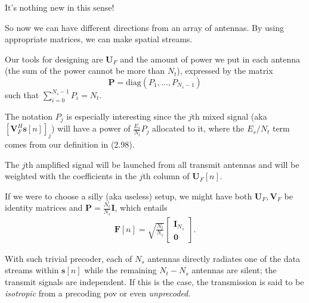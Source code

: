 \documentclass[a4paper, 12pt]{book}
\begin{document}
\noindent\colorbox{teal!10}{
    \begin{minipage}{\dimexpr\linewidth-2\fboxsep}
        It's nothing new in this sense!
    \end{minipage}
}

So now we can have different directions from an array of antennas.
By using appropriate matrices, we can make spatial streams.

Our tools for designing are $\mathbf{U}_F$ and the amount of power we put in each antenna (the sum of the power cannot be more than $N_t$), expressed by the matrix
\[ \mathbf{P} = \text{diag}(P_1, \dots, P_{N_s-1}) \]
such that $\sum_{i=0}^{N_s-1} P_i = N_t$.

The notation $P_j$ is especially interesting since the $j$th mixed signal (aka $[\mathbf{V}_F^H \mathbf{s}[n]]_j$) will have a power of $\frac{E_s}{N_t}P_j$ allocated to it, where the $E_s/N_t$ term comes from our definition in (2.98).

The $j$th amplified signal will be launched from all transmit antennas and will be weighted with the coefficients in the $j$th column of $\mathbf{U}_F[n]$.

If we were to choose a silly (aka useless) setup, we might have both $\mathbf{U}_F, \mathbf{V}_F$ be identity matrices and $\mathbf{P} = \frac{N_t}{N_s}\mathbf{I}$, which entails
\begin{align}
\mathbf{F}[n] = \sqrt{\frac{N_t}{N_s}} \begin{bmatrix} \mathbf{I}_{N_s} \\ \mathbf{0} \end{bmatrix}. \tag{2.102}
\end{align}

With such trivial precoder, each of $N_s$ antennas directly radiates one of the data streams within $\mathbf{s}[n]$ while the remaining $N_t - N_s$ antennas are silent; the transmit signals are independent. If this is the case, the transmission is said to be \textit{isotropic} from a precoding pov or even \textit{unprecoded}.
\end{document}
